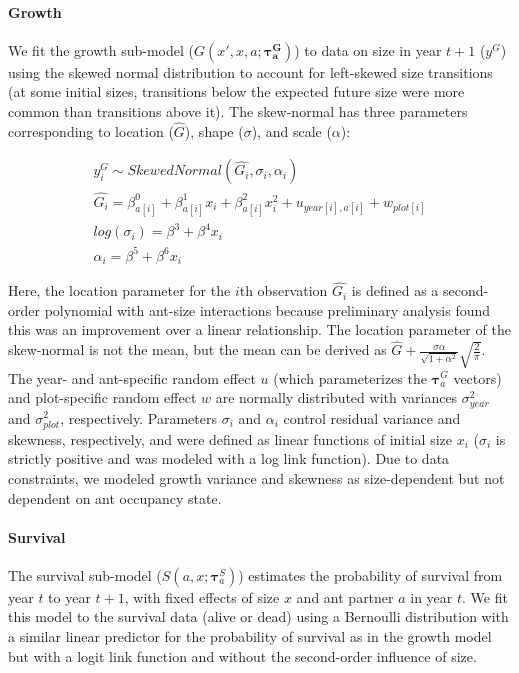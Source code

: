 \documentclass[11pt]{article}
\begin{document}
\paragraph{Growth}
We fit the growth sub-model ($G(x',x,a;\pmb{\tau^G_{a}})$) to data on size in year $t+1$ ($y^G$) using the skewed normal distribution to account for left-skewed size transitions (at some initial sizes, transitions below the expected future size were more common than transitions above it). 
The skew-normal has three parameters corresponding to location ($\hat{G}$), shape ($\sigma$), and scale ($\alpha$):
\begin{linenomath*}
	\begin{gather}
	y_i^G \sim Skewed Normal(\hat{G_i},\sigma_i,\alpha_i) \\
	\hat{G_i} = \beta^0_{a[i]} + \beta^1_{a[i]} x_i + \beta^2_{a[i]} x_i^2 + u_{year[i],a[i]} + w_{plot[i]} \\
	log(\sigma_i)  = \beta^3 + \beta^4 x_i \\
	\alpha_i = \beta^5 + \beta^6 x_i
	\label{eqn:growth}
	\end{gather}
\end{linenomath*}
Here, the location parameter for the $i$th observation $\hat{G_i}$ is defined as a second-order polynomial with ant-size interactions because  preliminary analysis found this was an improvement over a linear relationship.
The location parameter of the skew-normal is not the mean, but the mean can be derived as $\hat{G} + \frac{\sigma\alpha}{\sqrt{1+\alpha^2}} \sqrt{\frac{2}{\pi}}$. 
The year- and ant-specific random effect $u$ (which parameterizes the $\pmb{\tau}^G_{a}$ vectors) and plot-specific random effect $w$ are normally distributed with variances $\sigma^2_{year}$ and $\sigma^2_{plot}$, respectively. 
Parameters $\sigma_i$ and $\alpha_i$  control residual variance and skewness, respectively, and were defined as linear functions of initial size $x_i$ ($\sigma_i$ is strictly positive and was modeled with a log link function). 
Due to data constraints, we modeled growth variance and skewness as size-dependent but not dependent on ant occupancy state. 

\paragraph{Survival}
The survival sub-model ($S(a,x;\pmb{\tau}_{a}^{S})$) estimates the probability of survival from year $t$ to year $t+1$, with fixed effects of size $x$ and ant partner $a$ in year $t$.
We fit this model to the survival data (alive or dead) using a Bernoulli distribution with a similar linear predictor for the probability of survival as in the growth model but with a logit link function and without the second-order influence of size.
\end{document}
